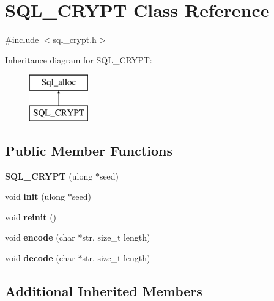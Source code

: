 \hypertarget{classSQL__CRYPT}{}\section{S\+Q\+L\+\_\+\+C\+R\+Y\+PT Class Reference}
\label{classSQL__CRYPT}


{\ttfamily \#include $<$sql\+\_\+crypt.\+h$>$}

Inheritance diagram for S\+Q\+L\+\_\+\+C\+R\+Y\+PT\+:\begin{figure}[H]
\begin{center}
\leavevmode
\includegraphics[height=2.000000cm]{classSQL__CRYPT}
\end{center}
\end{figure}
\subsection*{Public Member Functions}
\begin{DoxyCompactItemize}
\item 
\mbox{\label{classSQL__CRYPT_a12ccf9428ba093ec9b734078a07f58a0}} 
{\bfseries S\+Q\+L\+\_\+\+C\+R\+Y\+PT} (ulong $\ast$seed)
\item 
\mbox{\label{classSQL__CRYPT_a64d26ac20372089200a95a8c3c6be090}} 
void {\bfseries init} (ulong $\ast$seed)
\item 
\mbox{\label{classSQL__CRYPT_a10abbd9b249064054bf9e8ff73059867}} 
void {\bfseries reinit} ()
\item 
\mbox{\label{classSQL__CRYPT_ac91bb7d80fe03be65b572fe5325b6b2f}} 
void {\bfseries encode} (char $\ast$str, size\+\_\+t length)
\item 
\mbox{\label{classSQL__CRYPT_a4e1d5f1f1852d389e3d65aca703d268d}} 
void {\bfseries decode} (char $\ast$str, size\+\_\+t length)
\end{DoxyCompactItemize}
\subsection*{Additional Inherited Members}


